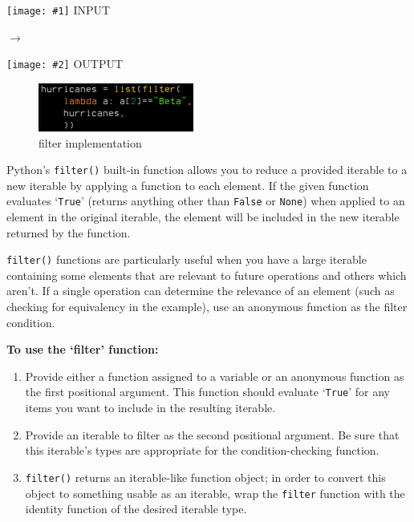\documentclass[12pt]{article}
\newcommand{\bna}[2]{
        \begin{minipage}[c]{.4\textwidth}
		\begin{center}
		\texttt{[image: \#1]}
		\textsc{INPUT}
		\end{center}
        \end{minipage}
	\begin{minipage}[c]{.1\textwidth}
		\center\LARGE$\longrightarrow$
	\end{minipage}
        \begin{minipage}[c]{.4\textwidth}
		\begin{center}
		\texttt{[image: \#2]}
		\textsc{OUTPUT}
		\end{center}
        \end{minipage}\vspace{.12in}
        }
\begin{document}
\begin{center}
\bna{./figures/5_filter/in_filter.png}{./figures/5_filter/out_filter.png}
\end{center}

\begin{figure}
	\begin{center}
		\includegraphics[width=.38\textwidth]{./figures/5_filter/codeblock_filter.png}
		\caption{filter implementation}
		\label{filter code} %
	\end{center}
\end{figure}

Python's \texttt{filter()} built-in function allows you to reduce a provided iterable to a new iterable by applying a function to each element. If the given function evaluates `\texttt{True}' (returns anything other than \texttt{False} or \texttt{None}) when applied to an element in the original iterable, the element will be included in the new iterable returned by the function.

\texttt{filter()} functions are particularly useful when you have a large iterable containing some elements that are relevant to future operations and others which aren't. If a single operation can determine the relevance of an element (such as checking for equivalency in the example), use an anonymous function as the filter condition.

\vspace{1em}
\noindent
\textbf{To use the `filter' function:}
\begin{enumerate}
	\item{Provide either a function assigned to a variable or an anonymous function as the first positional argument. This function should evaluate `\texttt{True}' for any items you want to include in the resulting iterable.}
	\item{Provide an iterable to filter as the second positional argument. Be sure that this iterable's types are appropriate for the condition-checking function.}
	\item{\texttt{filter()} returns an iterable-like function object; in order to convert this object to something usable as an iterable, wrap the \texttt{filter} function with the identity function of the desired iterable type.}
\end{enumerate}
\end{document}
